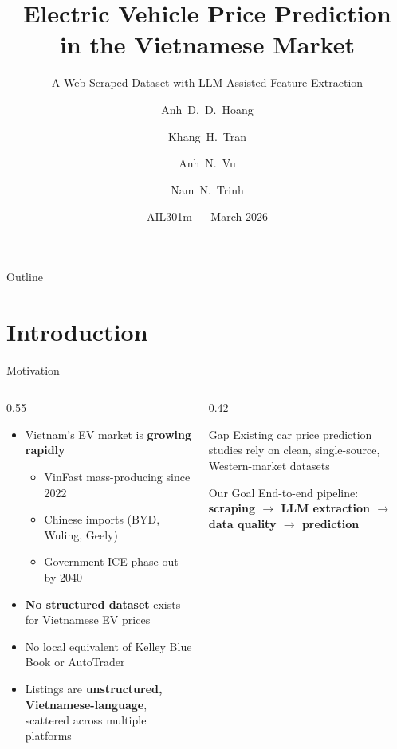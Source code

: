 \documentclass[aspectratio=169]{beamer}
\title[EV Price Prediction]{Electric Vehicle Price Prediction\\in the Vietnamese Market}
\subtitle{A Web-Scraped Dataset with LLM-Assisted Feature Extraction}
\author[Hoang et al.]{Anh~D.~D.~Hoang \and Khang~H.~Tran \and Anh~N.~Vu \and Nam~N.~Trinh}
\institute[FPT University]{%
  Information Technology Specialization\\
  FPT University, Hanoi, Vietnam
}
\date{AIL301m --- March 2026}
\begin{document}
\begin{frame}
  \titlepage
\end{frame}

\begin{frame}{Outline}
  \tableofcontents
\end{frame}

\section{Introduction}

\begin{frame}{Motivation}
  \begin{columns}[T]
    \begin{column}{0.55\textwidth}
      \begin{itemize}
        \item Vietnam's EV market is \textbf{growing rapidly}
          \begin{itemize}
            \item VinFast mass-producing since 2022
            \item Chinese imports (BYD, Wuling, Geely)
            \item Government ICE phase-out by 2040
          \end{itemize}
        \item \textbf{No structured dataset} exists for Vietnamese EV prices
        \item No local equivalent of Kelley Blue Book or AutoTrader
        \item Listings are \textbf{unstructured, Vietnamese-language}, scattered across multiple platforms
      \end{itemize}
    \end{column}
    \begin{column}{0.42\textwidth}
      \begin{block}{Gap}
        Existing car price prediction studies rely on clean, single-source, Western-market datasets
      \end{block}
      \vspace{0.5em}
      \begin{block}{Our Goal}
        End-to-end pipeline: \textbf{scraping $\to$ LLM extraction $\to$ data quality $\to$ prediction}
      \end{block}
    \end{column}
  \end{columns}
\end{frame}
\end{document}
